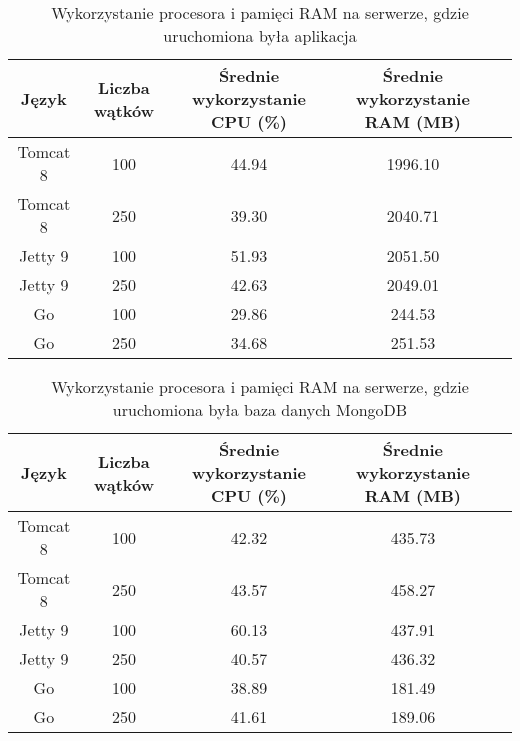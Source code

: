 
\begin{table}[!htb]
\centering
\caption{Wykorzystanie procesora i pamięci RAM na serwerze, gdzie uruchomiona była aplikacja}
\label{tab:app-full-key}
\begin{tabular}{@{}ccccl@{}}
\toprule
\textbf{Język} & \textbf{Liczba wątków} & \multicolumn{1}{p{3cm}}{\textbf{Średnie wykorzystanie CPU (\%)}} & \multicolumn{1}{p{3cm}}{\textbf{Średnie wykorzystanie RAM (MB)}} &  \\ \midrule
Tomcat 8       & 100                    & 44.94                             & 1996.10                          &  \\
Tomcat 8       & 250                    & 39.30                            & 2040.71                          &  \\
Jetty 9       & 100                    & 51.93                             & 2051.50                          &  \\
Jetty 9       & 250                    & 42.63                             & 2049.01                          &  \\
Go       & 100                    & 29.86                             & 244.53                          &  \\
Go       & 250                    & 34.68                             & 251.53                          &  \\
\bottomrule
\end{tabular}
\end{table}


\begin{table}[!htb]
\centering
\caption{Wykorzystanie procesora i pamięci RAM na serwerze, gdzie uruchomiona była baza danych MongoDB}
\label{tab:mongo-full-key}
\begin{tabular}{@{}ccccl@{}}
\toprule
\textbf{Język} & \textbf{Liczba wątków} & \multicolumn{1}{p{3cm}}{\textbf{Średnie wykorzystanie CPU (\%)}} & \multicolumn{1}{p{3cm}}{\textbf{Średnie wykorzystanie RAM (MB)}} &  \\ \midrule
Tomcat 8       & 100                    & 42.32                             & 435.73                          &  \\
Tomcat 8       & 250                    & 43.57                             & 458.27                          &  \\
Jetty 9       & 100                    & 60.13                             & 437.91                          &  \\
Jetty 9       & 250                    & 40.57                             & 436.32                          &  \\
Go       & 100                    & 38.89                             & 181.49                          &  \\
Go       & 250                    & 41.61                             & 189.06                          &  \\
\bottomrule
\end{tabular}
\end{table}

